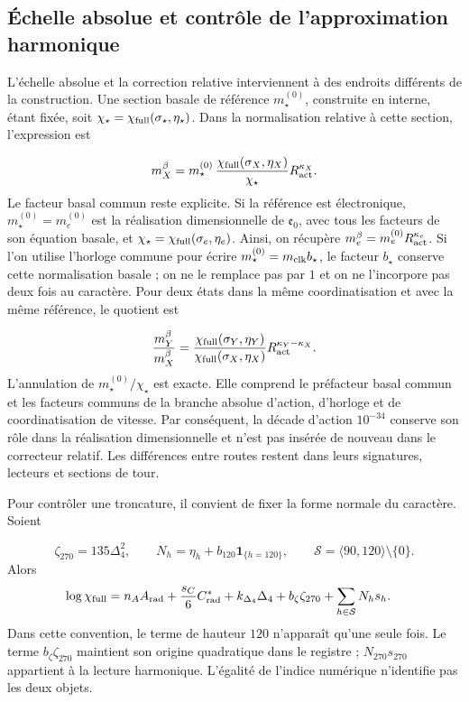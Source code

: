 \subsection{Échelle absolue et contrôle de l’approximation harmonique
}
\label{subsec:vi-precision-torres}

L’échelle absolue et la correction relative interviennent à des endroits
différents de la construction. Une section basale de référence
\(m_\star^{(0)}\), construite en interne, étant fixée, soit
\(\chi_\star=\chi_{\rm full}(\sigma_\star,\eta_\star)\).
Dans la normalisation relative à cette section, l’expression est

\[
 m_X^\beta=m_\star^{(0)}\,
 \frac{\chi_{\rm full}(\sigma_X,\eta_X)}{\chi_\star}
 R_{\rm act}^{\kappa_X}.
\]
Le facteur basal commun reste explicite. Si la référence est électronique,
\(m_\star^{(0)}=m_e^{(0)}\) est la réalisation dimensionnelle de
\(\mathfrak e_0\), avec tous les facteurs de son équation basale, et
\(\chi_\star=\chi_{\rm full}(\sigma_e,\eta_e)\). Ainsi, on récupère
\(m_e^\beta=m_e^{(0)}R_{\rm act}^{\kappa_e}\). Si l’on utilise l’horloge
commune pour écrire \(m_\star^{(0)}=m_{\rm clk}b_\star\), le
facteur \(b_\star\) conserve cette normalisation basale ; on ne le remplace pas
par \(1\) et on ne l’incorpore pas deux fois au caractère. Pour deux états
dans la même coordinatisation et avec la même référence, le quotient est

\[
 \frac{m_Y^\beta}{m_X^\beta}
 =\frac{\chi_{\rm full}(\sigma_Y,\eta_Y)}
        {\chi_{\rm full}(\sigma_X,\eta_X)}
     R_{\rm act}^{\kappa_Y-\kappa_X}.
\]
L’annulation de \(m_\star^{(0)}/\chi_\star\) est exacte. Elle comprend
le préfacteur basal commun et les facteurs communs de la branche absolue
d’action, d’horloge et de coordinatisation de vitesse. Par
conséquent, la décade d’action \(10^{-34}\) conserve son rôle dans
la réalisation dimensionnelle et n’est pas insérée de nouveau dans le correcteur
relatif. Les différences entre routes restent dans leurs signatures, lecteurs
et sections de tour.


Pour contrôler une troncature, il convient de fixer la forme normale du caractère.
Soient

\[
 \zeta_{270}=135\Delta_4^2,\qquad
 N_h=\eta_h+b_{120}\mathbf 1_{\{h=120\}},\qquad
 \mathcal S=\langle90,120\rangle\setminus\{0\}.
\]
Alors
\[
\begin{split}
 \log\chi_{\rm full}
 ={}&n_AA_{\rm rad}+\frac{s_C}{6}C^*_{\rm rad}
       +k_{\Delta_4}\Delta_4+b_\zeta\zeta_{270}
       +\sum_{h\in\mathcal S}N_hs_h .
\end{split}
\]
Dans cette convention, le terme de hauteur \(120\) n’apparaît qu’une seule fois.
Le terme \(b_\zeta\zeta_{270}\) maintient son origine quadratique dans le
registre ; \(N_{270}s_{270}\) appartient à la lecture harmonique.
L’égalité de l’indice numérique n’identifie pas les deux objets.


